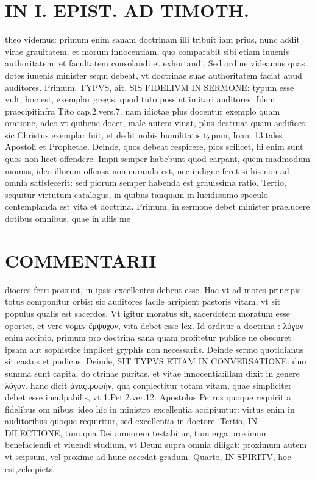 \documentclass{article}
\begin{document}
\begin{pages}
\section*{IN I. EPIST. AD TIMOTH. }
\marginpar{[ p.107 ]}\pstart theo videmus: primum enim sanam doctrinam illi tribuit iam prius, nunc addit virae grauitatem, et morum innocentiam, quo comparabit sibi etiam iuuenis authoritatem, et facultatem consolandi et exhortandi.  \pend\pstart Sed ordine videamus quas dotes iuuenis minister sequi debeat, vt doctrinae suae authoritatem faciat apud auditores. Primum, TYPVS, ait, SIS FIDELIVM IN SERMONE: typum esse vult, hoc est, exemplar gregis, quod tuto possint imitari auditores. Idem praecipitinfra Tito cap.2.vers.7. nam idiotae plus docentur exemplo quam oratione, adeo vt quibene docet, male autem viuat, plus destruat quam aedificet: sic Christus exemplar fuit, et dedit nobis humilitatis typum, Ioan. 13.tales Apostoli et Prophetae.  \pend\pstart Deinde, quos debeat respicere, pios scilicet, hi enim sunt quos non licet offendere. Impii semper habebunt quod carpant, quem madmodum momus, ideo illorum offensa non curanda est, nec indigne feret si his non ad omnia satisfecerit: sed piorum semper habenda est grauissima ratio.  \pend\pstart Tertio, sequitur virtutum catalogus, in quibus tanquam in lucidissimo speculo contemplanda est vita et doctrina.  \pend\pstart Primum, in sermone debet minister praelucere dotibus omnibus, quae in aliis me\pend
\section*{COMMENTARII }
\marginpar{[ p.108 ]}\pstart diocres ferri possunt, in ipsis excellentes debent esse. Hac vt ad mores principis totus componitur orbis: sic auditores facile arripient pastoris vitam, vt sit populus qualis est sacerdos. Vt igitur moratus sit, sacerdotem moratum esse oportet, et vere voμεν ἔμψυχον, vita debet esse lex. Id orditur a doctrina : λόγον enim accipio, primum pro doctrina sana quam profitetur publice ne obscuret ipsam aut sophistice implicet gryphis non necessariis. Deinde sermo quotidianus sit castus et pudicus.  \pend\pstart Deinde, SIT TYPVS ETIAM IN CONVERSATIONE: duo summa sunt capita, do ctrinae puritas, et vitae innocentia:illam dixit in genere λόγον. hanc dicit ἀναςτροφήν, qua conplectitur totam vitam, quae simpliciter debet esse inculpabilis, vt 1.Pet.2.ver.12. Apostolus Petrus quoque requirit a fidelibus om nibus: ideo hic in ministro excellentia accipiuntur: virtus enim in auditoribus quoque requiritur, sed excellentia in doctore.  \pend\pstart Tertio, IN DILECTIONE, tum qua Dei amnorem testabitur, tum erga proximum benefaciendi et viuendi studium, vt Deum supra omnia diligat: proximum autem vt seipsum, vel proxime ad hunc accedat gradum.  \pend\pstart Quarto, IN SPIRITV, hoc est,zelo pieta\pend

\end{pages}
\end{document}
